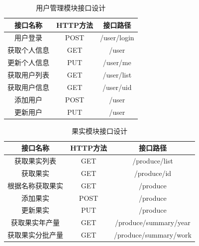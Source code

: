 \begin{table}[H]
\centering
\begin{tabular}{|c|c|c|}
\hline
\textbf{接口名称} & \textbf{HTTP方法} & \textbf{接口路径} \\
\hline
用户登录 & POST & /user/login \\
\hline
获取个人信息 & GET & /user \\
\hline
更新个人信息 & PUT & /user/me \\
\hline
获取用户列表 & GET & /user/list \\
\hline
获取用户信息 & GET & /user/{uid} \\
\hline
添加用户 & POST & /user \\
\hline
更新用户 & PUT & /user \\
\hline
\end{tabular}%

\caption{用户管理模块接口设计}
\label{tab:用户管理模块接口设计}
\end{table}

\begin{table}[H]
\centering
\begin{tabular}{|c|c|c|}
\hline
\textbf{接口名称} & \textbf{HTTP方法} & \textbf{接口路径} \\
\hline
获取果实列表 & GET & /produce/list \\
\hline
获取果实 & GET & /produce/{id} \\
\hline
根据名称获取果实 & GET & /produce \\
\hline
添加果实 & POST & /produce \\
\hline
更新果实 & PUT & /produce \\
\hline
获取果实年产量 & GET & /produce/summary/year \\
\hline
获取果实分批产量 & GET & /produce/summary/work \\
\hline
\end{tabular}%

\caption{果实模块接口设计}
\label{tab:果实模块接口设计}
\end{table}

